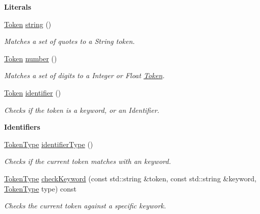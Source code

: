 \begin{Indent}\textbf{ Literals}\par
\begin{DoxyCompactItemize}
\item 
\hyperlink{struct_token}{Token} \hyperlink{class_scanner_ab32009f01ca94ea6b5537a0283514aaa}{string} ()
\begin{DoxyCompactList}\small\item\em Matches a set of quotes to a String token. \end{DoxyCompactList}\item 
\hyperlink{struct_token}{Token} \hyperlink{class_scanner_a57a954e1177976e9179432d2229f8868}{number} ()
\begin{DoxyCompactList}\small\item\em Matches a set of digits to a Integer or Float \hyperlink{struct_token}{Token}. \end{DoxyCompactList}\item 
\hyperlink{struct_token}{Token} \hyperlink{class_scanner_ad4ea1c411d7a3952f29072abdf8d1315}{identifier} ()
\begin{DoxyCompactList}\small\item\em Checks if the token is a keyword, or an Identifier. \end{DoxyCompactList}\end{DoxyCompactItemize}
\end{Indent}
\begin{Indent}\textbf{ Identifiers}\par
\begin{DoxyCompactItemize}
\item 
\hyperlink{_scanner_8h_aa520fbf142ba1e7e659590c07da31921}{Token\+Type} \hyperlink{class_scanner_a6648f48e10f8408d7fa427562fb21200}{identifier\+Type} ()
\begin{DoxyCompactList}\small\item\em Checks if the current token matches with an keyword. \end{DoxyCompactList}\item 
\hyperlink{_scanner_8h_aa520fbf142ba1e7e659590c07da31921}{Token\+Type} \hyperlink{class_scanner_a078d11dc2b435cd82d4673f34aa531ad}{check\+Keyword} (const std\+::string \&token, const std\+::string \&keyword, \hyperlink{_scanner_8h_aa520fbf142ba1e7e659590c07da31921}{Token\+Type} type) const
\begin{DoxyCompactList}\small\item\em Checks the current token against a specific keywork. \end{DoxyCompactList}\end{DoxyCompactItemize}
\end{Indent}
